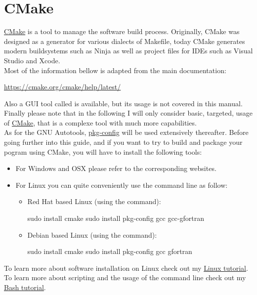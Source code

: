 \section{CMake}

\href{https://cmake.org}{CMake} is a tool to manage the software build process. 
Originally, CMake was designed as a generator for various dialects of Makefile, today CMake generates modern buildsystems such as Ninja as well as project files for IDEs such as Visual Studio and Xcode. \\
Most of the information bellow is adapted from the main documentation: 
\begin{center}\href{https://cmake.org/cmake/help/latest/}{https://cmake.org/cmake/help/latest/} \end{center}
Also a GUI tool called  is available, but its usage is not covered in this manual. \\
Finally please note that in the following I will only consider basic, targeted, usage of \href{https://cmake.org}{CMake}, that is a complexe tool with much more capabilities. \\[0.25cm]
As for the GNU Autotools, \href{https://en.wikipedia.org/wiki/Pkg-config}{pkg-config} will be used extensively thereafter.  
Before going further into this guide, and if you want to try to build and package your pogram using CMake, you will have to install the following tools: 
\begin{itemize}
\item For Windows and OSX please refer to the corresponding websites.
\item For Linux you can quite conveniently use the command line as follow:
\begin{itemize}
\item Red Hat based Linux (using the  command):
\begin{scriptii}
\fprompt{~} sudo  install cmake
\fprompt{~} sudo  install pkg-config gcc gcc-gfortran
\end{scriptii}
\item Debian based Linux (using the  command):
\begin{scriptii}
\fprompt{~} sudo  install cmake
\fprompt{~} sudo  install pkg-config gcc gfortran
\end{scriptii}
\end{itemize}
\end{itemize}
To learn more about software installation on Linux check out my \href{https://www.ipcms.fr/wp-content/uploads/2021/11/linux.pdf}{Linux tutorial}. \\
To learn more about scripting and the usage of the command line check out my \href{https://www.ipcms.fr/wp-content/uploads/2021/05/bash.pdf}{Bash tutorial}. 

